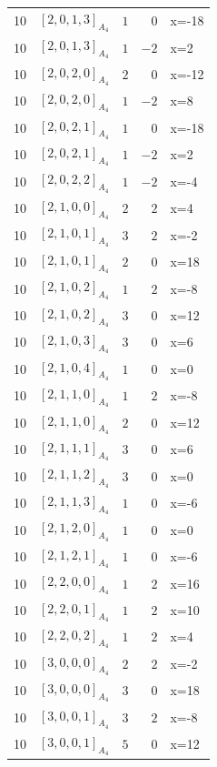 \documentclass[11pt]{article}
\newcommand{\Dynkin}[1]{#1}
\begin{document}
\begin{longtable}{r l r r l}
10 & $\Dynkin{[2,0,1,3]_{A_4}}$ & $1$ & $0$ & x=-18\\
10 & $\Dynkin{[2,0,1,3]_{A_4}}$ & $1$ & $-2$ & x=2\\
10 & $\Dynkin{[2,0,2,0]_{A_4}}$ & $2$ & $0$ & x=-12\\
10 & $\Dynkin{[2,0,2,0]_{A_4}}$ & $1$ & $-2$ & x=8\\
10 & $\Dynkin{[2,0,2,1]_{A_4}}$ & $1$ & $0$ & x=-18\\
10 & $\Dynkin{[2,0,2,1]_{A_4}}$ & $1$ & $-2$ & x=2\\
10 & $\Dynkin{[2,0,2,2]_{A_4}}$ & $1$ & $-2$ & x=-4\\
10 & $\Dynkin{[2,1,0,0]_{A_4}}$ & $2$ & $2$ & x=4\\
10 & $\Dynkin{[2,1,0,1]_{A_4}}$ & $3$ & $2$ & x=-2\\
10 & $\Dynkin{[2,1,0,1]_{A_4}}$ & $2$ & $0$ & x=18\\
10 & $\Dynkin{[2,1,0,2]_{A_4}}$ & $1$ & $2$ & x=-8\\
10 & $\Dynkin{[2,1,0,2]_{A_4}}$ & $3$ & $0$ & x=12\\
10 & $\Dynkin{[2,1,0,3]_{A_4}}$ & $3$ & $0$ & x=6\\
10 & $\Dynkin{[2,1,0,4]_{A_4}}$ & $1$ & $0$ & x=0\\
10 & $\Dynkin{[2,1,1,0]_{A_4}}$ & $1$ & $2$ & x=-8\\
10 & $\Dynkin{[2,1,1,0]_{A_4}}$ & $2$ & $0$ & x=12\\
10 & $\Dynkin{[2,1,1,1]_{A_4}}$ & $3$ & $0$ & x=6\\
10 & $\Dynkin{[2,1,1,2]_{A_4}}$ & $3$ & $0$ & x=0\\
10 & $\Dynkin{[2,1,1,3]_{A_4}}$ & $1$ & $0$ & x=-6\\
10 & $\Dynkin{[2,1,2,0]_{A_4}}$ & $1$ & $0$ & x=0\\
10 & $\Dynkin{[2,1,2,1]_{A_4}}$ & $1$ & $0$ & x=-6\\
10 & $\Dynkin{[2,2,0,0]_{A_4}}$ & $1$ & $2$ & x=16\\
10 & $\Dynkin{[2,2,0,1]_{A_4}}$ & $1$ & $2$ & x=10\\
10 & $\Dynkin{[2,2,0,2]_{A_4}}$ & $1$ & $2$ & x=4\\
10 & $\Dynkin{[3,0,0,0]_{A_4}}$ & $2$ & $2$ & x=-2\\
10 & $\Dynkin{[3,0,0,0]_{A_4}}$ & $3$ & $0$ & x=18\\
10 & $\Dynkin{[3,0,0,1]_{A_4}}$ & $3$ & $2$ & x=-8\\
10 & $\Dynkin{[3,0,0,1]_{A_4}}$ & $5$ & $0$ & x=12\\

\end{longtable}
\end{document}
